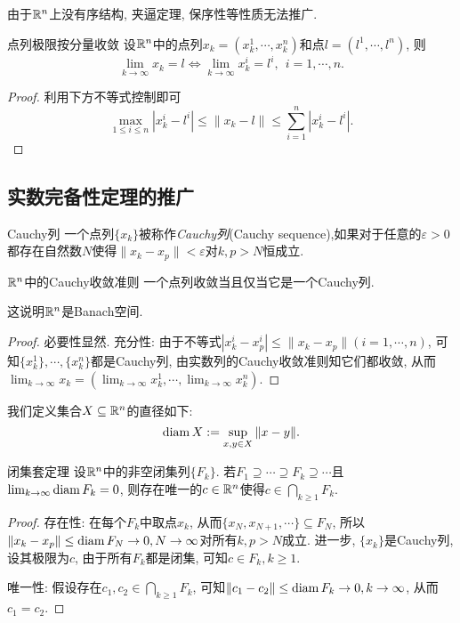 由于$\mathbb{R} ^n$上没有序结构, 夹逼定理, 保序性等性质无法推广. 

\begin{lemma}{点列极限按分量收敛}
	设$\mathbb{R} ^n$中的点列$x_k = (x^1_k, \cdots ,x_k^n)$和点$l=(l^1,\cdots ,l^n)$, 则$$\lim_{k\to \infty} x_k = l \Longleftrightarrow \lim_{k\to \infty} x^i_k = l^i,~~i=1,\cdots ,n. $$
\end{lemma}
\begin{proof}
	利用下方不等式控制即可$$\max_{1 \leq i \leq n} |x^i_k-l^i| \leq \| x_k-l \| \leq \sum_{i=1}^{n} |x^i_k-l^i|. $$
\end{proof}

\subsection{实数完备性定理的推广}

\begin{definition}{Cauchy列}
	一个点列$\{ x_k \}$被称作\textit{Cauchy列}(Cauchy sequence),如果对于任意的$\varepsilon >0$都存在自然数$N$使得$\| x_k-x_p \|<\varepsilon$对$k,p>N$恒成立.
\end{definition}

\begin{theorem}{$\mathbb{R} ^n$中的Cauchy收敛准则}
	一个点列收敛当且仅当它是一个Cauchy列.
\end{theorem}
\begin{remark}
	这说明$\mathbb{R} ^n$是Banach空间. 
\end{remark}
\begin{proof}
	必要性显然. 充分性: 由于不等式$|x^i_k - x^i_p| \leq \| x_k - x_p \|(i=1,\cdots ,n)$, 可知$\{ x^1_k \},\cdots ,\{ x^n_k \}$都是Cauchy列, 由实数列的Cauchy收敛准则知它们都收敛, 从而$\lim_{k\to \infty} x_k = (\lim_{k\to \infty} x^1_k,\cdots , \lim_{k\to \infty} x^n_k)$. 
\end{proof}

我们定义集合$X \subseteq \mathbb{R} ^n$的直径如下: $$\operatorname{diam} X := \sup_{x,y \in X} \| x-y \|. $$

\begin{theorem}{闭集套定理}
	设$\mathbb{R} ^n$中的非空闭集列$\{ F_k \}$. 若$F_1 \supseteq \cdots \supseteq F_k \supseteq \cdots$且$\lim_{k\to \infty} \operatorname{diam} F_k=0$, 则存在唯一的$c \in \mathbb{R} ^n$使得$c \in \bigcap_{k\geq 1} F_k$. 
\end{theorem}
\begin{proof}
	存在性: 在每个$F_k$中取点$x_k$, 从而$\{ x_N,x_{N+1},\cdots \} \subseteq F_N$, 所以$\| x_{k}-x_p \| \leq \operatorname{diam} F_N \to 0, N\to \infty$对所有$k,p >N$成立. 进一步, $\{ x_k \}$是Cauchy列, 设其极限为$c$, 由于所有$F_k$都是闭集, 可知$c \in F_k,k\geq 1$. 
	
	唯一性: 假设存在$c_1,c_2 \in \bigcap_{k\geq 1} F_k$, 可知$\| c_1-c_2 \| \leq \operatorname{diam} F_k \to 0, k\to \infty$, 从而$c_1=c_2$. 
\end{proof}

